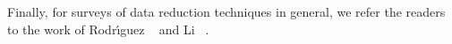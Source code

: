 
Finally, for surveys of data reduction techniques in general, we refer the readers to the work of
Rodr\'{\i}guez \etal~\cite{state-of-the-art-compressed-volume} and Li \etal~\cite{li2018}.
